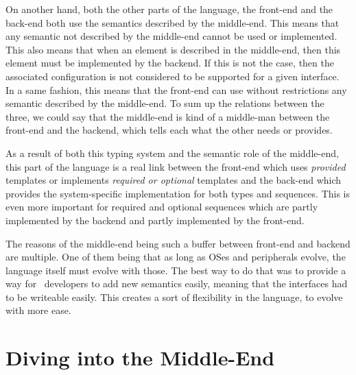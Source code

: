 \documentclass[american]{rtxreport}
\begin{document}
On another hand, both the other parts of the language, the front-end and the
back-end both use the semantics described by the middle-end. This means that
any semantic not described by the middle-end cannot be used or implemented.
This also means that when an element is described in the middle-end, then
this element must be implemented by the backend. If this is not the case,
then the associated configuration is not considered to be supported for
a given interface. In a same fashion, this means that the front-end can use
without restrictions any semantic described by the middle-end. To sum up
the relations between the three, we could say that the middle-end is kind
of a middle-man between the front-end and the backend, which tells each
what the other needs or provides.

As a result of both this typing system and the semantic role of the middle-end,
this part of the language is a real link between the front-end which uses
\emph{provided} templates or implements \emph{required or optional} templates
and the back-end which provides the system-specific implementation for both
types and sequences. This is even more important for required and optional
sequences which are partly implemented by the backend and partly implemented
by the front-end.

The reasons of the middle-end being such a buffer between front-end and
backend are multiple. One of them being that as long as OSes and peripherals
evolve, the language itself must evolve with those. The best way to do that
was to provide a way for \rtx\ developers to add new semantics easily,
meaning that the interfaces had to be writeable easily. This creates a
sort of flexibility in the language, to evolve with more ease.


\chapter{Diving into the Middle-End}
\end{document}
